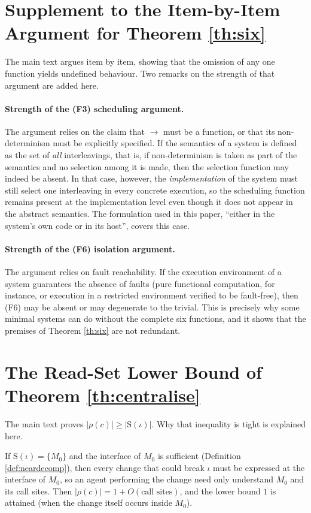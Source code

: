 \section{Supplement to the Item-by-Item Argument for Theorem \ref{th:six}}

The main text argues item by item, showing that the omission of any one function yields
undefined behaviour. Two remarks on the strength of that argument are added here.

\paragraph{Strength of the (F3) scheduling argument.}
The argument relies on the claim that $\to$ must be a function, or that its
non-determinism must be explicitly specified. If the semantics of a system is defined as
the set of \emph{all} interleavings, that is, if non-determinism is taken as part of the
semantics and no selection among it is made, then the selection function may indeed be
absent. In that case, however, the \emph{implementation} of the system must still select
one interleaving in every concrete execution, so the scheduling function remains present
at the implementation level even though it does not appear in the abstract semantics. The
formulation used in this paper, ``either in the system's own code or in its host'', covers
this case.

\paragraph{Strength of the (F6) isolation argument.}
The argument relies on fault reachability. If the execution environment of a system
guarantees the absence of faults (pure functional computation, for instance, or execution
in a restricted environment verified to be fault-free), then (F6) may be absent or may
degenerate to the trivial. This is precisely why some minimal systems can do without the
complete six functions, and it shows that the premises of Theorem \ref{th:six} are not
redundant.

\section{The Read-Set Lower Bound of Theorem \ref{th:centralise}}

The main text proves $|\rho(c)| \ge |\mathrm{S}(\iota)|$. Why that inequality is tight is
explained here.

If $\mathrm{S}(\iota) = \{M_0\}$ and the interface of $M_0$ is sufficient
(Definition \ref{def:neardecomp}), then every change that could break $\iota$ must be
expressed at the interface of $M_0$, so an agent performing the change need only
understand $M_0$ and its call sites. Then $|\rho(c)| = 1 + O(\text{call sites})$, and the
lower bound $1$ is attained (when the change itself occurs inside $M_0$).

